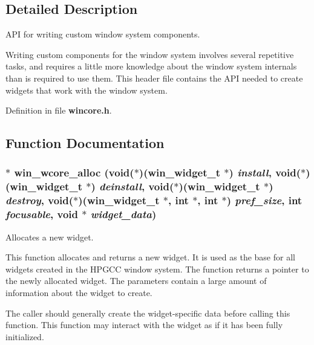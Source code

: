 \subsection{Detailed Description}
API for writing custom window system components. 

Writing custom components for the window system involves several repetitive tasks, and requires a little more knowledge about the window system internals than is required to use them. This header file contains the API needed to create widgets that work with the window system. 

Definition in file {\bf wincore.h}.

\subsection{Function Documentation}
\subsubsection{$\ast$ win\_\-wcore\_\-alloc (void($\ast$)({\bf win\_\-widget\_\-t} $\ast$) {\em install}, void($\ast$)({\bf win\_\-widget\_\-t} $\ast$) {\em deinstall}, void($\ast$)({\bf win\_\-widget\_\-t} $\ast$) {\em destroy}, void($\ast$)({\bf win\_\-widget\_\-t} $\ast$, int $\ast$, int $\ast$) {\em pref\_\-size}, int {\em focusable}, void $\ast$ {\em widget\_\-data})}\label{wincore_8h_a0}


Allocates a new widget. 

This function allocates and returns a new widget. It is used as the base for all widgets created in the HPGCC window system. The function returns a pointer to the newly allocated widget. The parameters contain a large amount of information about the widget to create.

The caller should generally create the widget-specific data before calling this function. This function may interact with the widget as if it has been fully initialized.

